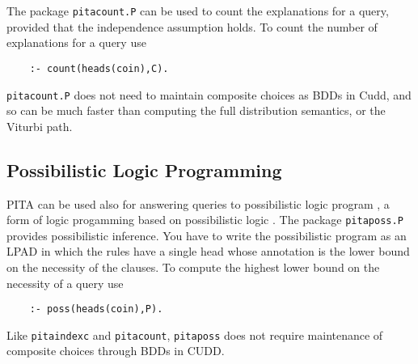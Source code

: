 The package \texttt{pitacount.P} can be used to count the explanations
for a query, provided that the independence assumption holds. To count
the number of explanations for a query use
\begin{verbatim}
    :- count(heads(coin),C).
\end{verbatim}
\texttt{pitacount.P} does not need to maintain composite choices as
BDDs in Cudd, and so can be much faster than computing the full
distribution semantics, or the Viturbi path.

\subsection{Possibilistic Logic Programming}
PITA can be used also for answering queries to possibilistic logic
program \cite{DBLP:conf/iclp/DuboisLP91}, a form of logic progamming
based on possibilistic logic \cite{DubLanPra-poss-94}. The package
\texttt{pitaposs.P} provides possibilistic inference.  You have to
write the possibilistic program as an LPAD in which the rules have a
single head whose annotation is the lower bound on the necessity of
the clauses. To compute the highest lower bound on the necessity of a
query use
\begin{verbatim}
    :- poss(heads(coin),P).
\end{verbatim}
Like {\tt pitaindexc} and {\tt pitacount}, {\tt pitaposs} does not
require maintenance of composite choices through BDDs in CUDD.

